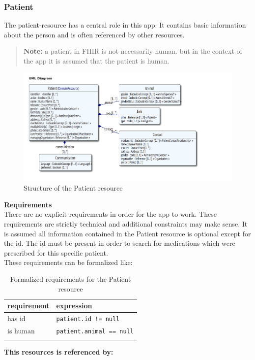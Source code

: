 \documentclass{article}
\begin{document}
\subsubsection{Patient}\label{res:patient}
The patient-resource has a central role in this app. It contains basic
information about the person and is often referenced by other resources.
\begin{quote}
\textbf{Note:} a patient in FHIR is not necessarily human. but in the
context of the app it is assumed that the patient is human.
\end{quote}
\begin{figure}[H]
\centering
\includegraphics[width=\linewidth]{resources/FHIR/Patient/Patient-UML.png}
\caption{Structure of the Patient resource}
\label{fig:structure-patient}
\end{figure}
\textbf{Requirements}\label{res:patient:requirements}
\\
There are no explicit requirements in order for the app to work.
These requirements are strictly technical and additional constraints may make sense.
It is assumed all information contained in the Patient resource is optional except for the id.
The id must be present in order to search for medications which were prescribed for this specific patient.
\\
These requirements can be formalized like:
\\
\begin{longtable}[]{@{}ll@{}}
\toprule
requirement & expression\tabularnewline
\midrule
has id & \texttt{patient.id != null}\tabularnewline
is human & \texttt{patient.animal == null}\tabularnewline
\bottomrule
\caption{Formalized requirements for the Patient resource}
\end{longtable}
\textbf{This resources is referenced by:}\label{res:patient:referenced-by}
\\
\end{document}
